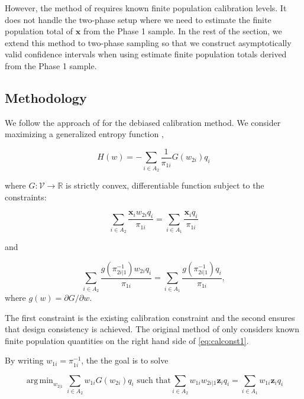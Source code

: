 \documentclass[12pt]{article}
\DeclareMathOperator*{\argmin}{arg\,min}
\newcommand{\R}{\mathbb{R}}
\renewcommand{\bf}[1]{\mathbf{#1}}
\begin{document}
However, the method of \cite{kwon2024debiased} requires known finite population 
calibration levels. It does not handle the
two-phase setup where we need to estimate the finite population total of $\bf x$
from the Phase 1 sample. In the rest of the section, we extend this method to 
two-phase sampling so that we construct asymptotically valid confidence
intervals when using estimate finite population totals derived from the Phase 1
sample.

\subsection{Methodology}

We follow the approach of \cite{kwon2024debiased} for the debiased calibration
method. We consider maximizing a generalized entropy function
\cite{gneiting2007strictly},

\begin{equation}\label{eq:primalloss}
  H(w) = - \sum_{i \in A_2} \frac{1}{\pi_{1i}} G(w_{2i}) q_i
\end{equation}

where $G: \mathcal{V} \to \R$ is strictly convex, differentiable function
subject to the constraints:

\begin{equation}\label{eq:calconst1}
  \sum_{i \in A_2} \frac{\bf x_i w_{2i}q_i}{\pi_{1i}} = 
\sum_{i \in A_1} \frac{\bf x_iq_i}{\pi_{1i}}
\end{equation}

and 

\begin{equation}\label{eq:calconst2}
  \sum_{i \in A_2} \frac{g(\pi_{2i|1}^{-1})w_{2i}q_i}{\pi_{1i}} = 
  \sum_{i \in A_1} \frac{g(\pi_{2i|1}^{-1})q_i}{\pi_{1i}}, 
\end{equation}
where $g(w) = \partial G / \partial w$. 

The first constraint is the existing calibration constraint and the second
ensures that design consistency is achieved. 
The original method of \cite{kwon2024debiased} only considers known finite
population quantities on the right hand side of \eqref{eq:calconst1}.

By writing $w_{1i} = \pi_{1i}^{-1}$, the the goal is to solve

\begin{equation}\label{eq:primal}
  \argmin_{w_{2|1}} \sum_{i \in A_2} w_{1i} G(w_{2i}) q_i 
  \text{ such that}
  \sum_{i \in A_2} w_{1i} w_{2i|1} \bf z_i q_i = \sum_{i \in A_1} w_{1i} \bf z_i q_i
\end{equation}
\end{document}
